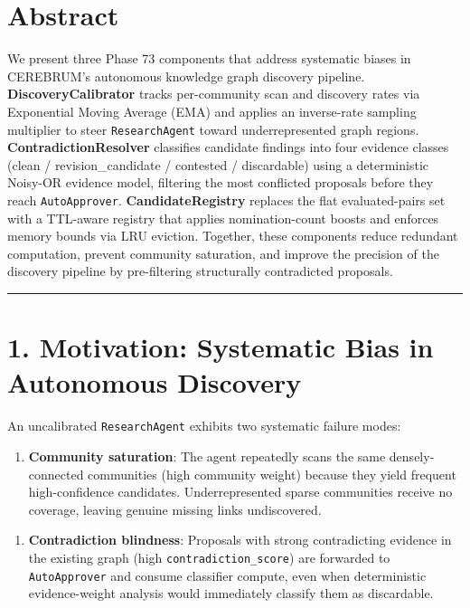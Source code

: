 
\section*{Abstract}

We present three Phase 73 components that address systematic biases in CEREBRUM's autonomous knowledge graph discovery pipeline. \textbf{DiscoveryCalibrator} tracks per-community scan and discovery rates via Exponential Moving Average (EMA) and applies an inverse-rate sampling multiplier to steer \texttt{ResearchAgent} toward underrepresented graph regions. \textbf{ContradictionResolver} classifies candidate findings into four evidence classes (clean / revision_candidate / contested / discardable) using a deterministic Noisy-OR evidence model, filtering the most conflicted proposals before they reach \texttt{AutoApprover}. \textbf{CandidateRegistry} replaces the flat evaluated-pairs set with a TTL-aware registry that applies nomination-count boosts and enforces memory bounds via LRU eviction. Together, these components reduce redundant computation, prevent community saturation, and improve the precision of the discovery pipeline by pre-filtering structurally contradicted proposals.

\medskip\noindent\rule{\linewidth}{0.4pt}\medskip

\section*{1. Motivation: Systematic Bias in Autonomous Discovery}

An uncalibrated \texttt{ResearchAgent} exhibits two systematic failure modes:

\begin{enumerate}
  \item \textbf{Community saturation}: The agent repeatedly scans the same densely-connected communities (high community weight) because they yield frequent high-confidence candidates. Underrepresented sparse communities receive no coverage, leaving genuine missing links undiscovered.
\end{enumerate}


\begin{enumerate}
  \item \textbf{Contradiction blindness}: Proposals with strong contradicting evidence in the existing graph (high \texttt{contradiction\_score}) are forwarded to \texttt{AutoApprover} and consume classifier compute, even when deterministic evidence-weight analysis would immediately classify them as discardable.
\end{enumerate}


